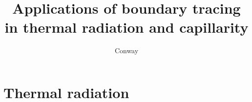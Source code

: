 \documentclass[a4paper,11pt]{book}
\title{Applications of boundary tracing in thermal radiation and capillarity}
\author{Conway}
\newcommand*{\+}{\phantom{+}}
\begin{document}
\frontmatter

\tableofcontents

\mainmatter




\part{Thermal radiation}
\label{pt:radiation}





\backmatter



\end{document}
